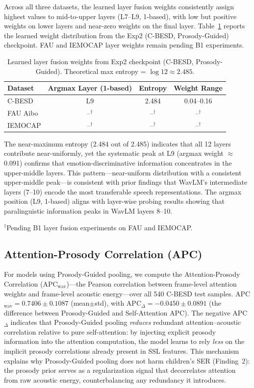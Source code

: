 Across all three datasets, the learned layer fusion weights consistently assign
highest values to mid-to-upper layers (L7--L9, 1-based), with low but positive
weights on lower layers and near-zero weights on the final layer.
Table~\ref{tab:layer_weights} reports the learned weight distribution from the
Exp2 (C-BESD, Prosody-Guided) checkpoint. FAU and IEMOCAP layer weights remain
pending B1 experiments.

\begin{table}[h]
\centering
\caption{Learned layer fusion weights from Exp2 checkpoint (C-BESD, Prosody-Guided). Theoretical max entropy = $\log 12 \approx 2.485$.}
\label{tab:layer_weights}
\begin{tabular}{lccc}
\toprule
\textbf{Dataset} & \textbf{Argmax Layer (1-based)} & \textbf{Entropy} & \textbf{Weight Range} \\
\midrule
C-BESD & L9 & 2.484 & 0.04--0.16 \\
FAU Aibo & --$^\dagger$ & --$^\dagger$ & --$^\dagger$ \\
IEMOCAP & --$^\dagger$ & --$^\dagger$ & --$^\dagger$ \\
\bottomrule
\end{tabular}
\end{table}

\noindent The near-maximum entropy (2.484 out of 2.485) indicates that all 12
layers contribute near-uniformly, yet the systematic peak at L9 (argmax weight
$\approx$0.091) confirms that emotion-discriminative information concentrates in
the upper-middle layers. This pattern---near-uniform distribution with a
consistent upper-middle peak---is consistent with prior findings that WavLM's
intermediate layers (7--10) encode the most transferable speech representations.
The argmax position (L9, 1-based) aligns with layer-wise probing results
showing that paralinguistic information peaks in WavLM layers 8--10.

\noindent$^\dagger$Pending B1 layer fusion experiments on FAU and IEMOCAP.

\subsection{Attention-Prosody Correlation (APC)}

For models using Prosody-Guided pooling, we compute the Attention-Prosody
Correlation (APC$_{\text{wav}}$)---the Pearson correlation between frame-level
attention weights and frame-level acoustic energy---over all 540 C-BESD test
samples. APC$_{\text{wav}} = 0.7406 \pm 0.1087$ (mean$\pm$std), with
APC$_{\Delta} = -0.0450 \pm 0.0891$ (the difference between Prosody-Guided and
Self-Attention APC). The negative APC$_{\Delta}$ indicates that Prosody-Guided
pooling \textit{reduces} redundant attention--acoustic correlation relative to
pure self-attention: by injecting explicit prosody information into the
attention computation, the model learns to rely \textit{less} on the implicit
prosody correlations already present in SSL features. This mechanism explains
why Prosody-Guided pooling does not harm children's SER (Finding~2): the
prosody prior serves as a regularization signal that decorrelates attention
from raw acoustic energy, counterbalancing any redundancy it introduces.

